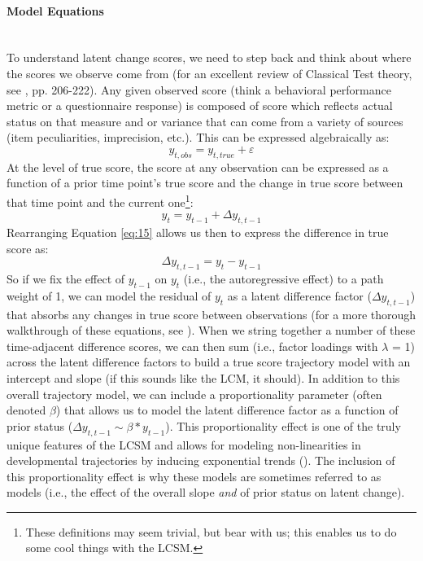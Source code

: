 \documentclass[11pt]{article}
\newcommand{\subsubsubsection}[1]{\paragraph{#1}\mbox{}\\}  %
\begin{document}
\subsubsubsection{Model Equations}
To understand latent change scores, we need to step back and think about where the scores we observe come from (for an excellent review of Classical Test theory, see \cite{bollen_structural_1989}, pp. 206-222). Any given observed score (think a behavioral performance metric or a questionnaire response) is composed of  score which reflects actual status on that measure and  or  variance that can come from a variety of sources (item peculiarities, imprecision, etc.). This can be expressed algebraically as:
%
\begin{equation} \label{eq:14}
y_{t,obs} = y_{t,true} + \varepsilon
\end{equation}
%
At the level of true score, the score at any observation can be expressed as a function of a prior time point’s true score and the change in true score between that time point and the current one\footnote{These definitions may seem trivial, but bear with us; this enables us to do some cool things with the LCSM.}:
%
\begin{equation} \label{eq:15}
y_{t} = y_{t-1} + \Delta y_{t,t-1}
\end{equation}
%
Rearranging Equation \ref{eq:15} allows us then to express the difference in true score as:
%
\begin{equation} \label{eq:16}
\Delta y_{t,t-1} = y_{t} - y_{t-1}
\end{equation}
%
So if we fix the effect of $y_{t-1}$ on $y_{t}$ (i.e., the autoregressive effect) to a path weight of 1, we can model the residual of $y_{t}$ as a latent difference factor ($\Delta y_{t,t-1}$) that absorbs any changes in true score between observations (for a more thorough walkthrough of these equations, see \cite{ghisletta_latent_2012}). When we string together a number of these time-adjacent difference scores, we can then sum (i.e., factor loadings with $\lambda$ = 1) across the latent difference factors to build a true score trajectory model with an intercept and slope (if this sounds like the LCM, it should). In addition to this overall trajectory model, we can include a proportionality parameter (often denoted $\beta$) that allows us to model the latent difference factor as a function of prior status ($\Delta y_{t,t-1} \sim \beta * y_{t-1}$). This proportionality effect is one of the truly unique features of the LCSM and allows for modeling non-linearities in developmental trajectories by inducing exponential trends (\cite{ghisletta_latent_2012,grimm_recent_2012,grimm_modeling_2013,mcardle_latent_2009}). The inclusion of this proportionality effect is why these models are sometimes referred to as  models (i.e., the effect of the overall slope \textit{and} of prior status on latent change).
\end{document}
